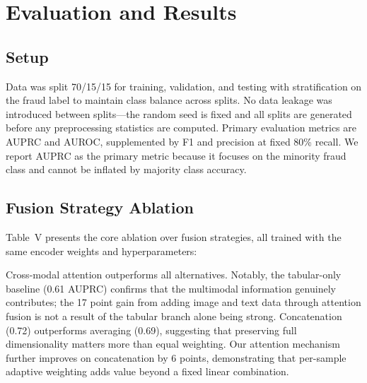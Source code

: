 \documentclass[10pt,conference,letterpaper]{IEEEtran}
\begin{document}
\section{Evaluation and Results}

\subsection{Setup}

Data was split 70/15/15 for training, validation, and testing with stratification on
the fraud label to maintain class balance across splits. No data leakage was introduced
between splits---the random seed is fixed and all splits are generated before any
preprocessing statistics are computed. Primary evaluation metrics are AUPRC and AUROC,
supplemented by F1 and precision at fixed 80\% recall. We report AUPRC as the primary
metric because it focuses on the minority fraud class and cannot be inflated by majority
class accuracy.

\subsection{Fusion Strategy Ablation}

Table~V presents the core ablation over fusion strategies, all trained with the same
encoder weights and hyperparameters:

\begin{table}[H]
\caption{Fusion Strategy Performance (Test Set)}
\label{tab:fusion_results}
\begin{center}
\end{center}
\end{table}

Cross-modal attention outperforms all alternatives. Notably, the tabular-only baseline
(0.61 AUPRC) confirms that the multimodal information genuinely contributes; the 17
point gain from adding image and text data through attention fusion is not a result of
the tabular branch alone being strong. Concatenation (0.72) outperforms averaging (0.69),
suggesting that preserving full dimensionality matters more than equal weighting. Our
attention mechanism further improves on concatenation by 6 points, demonstrating that
per-sample adaptive weighting adds value beyond a fixed linear combination.
\end{document}

